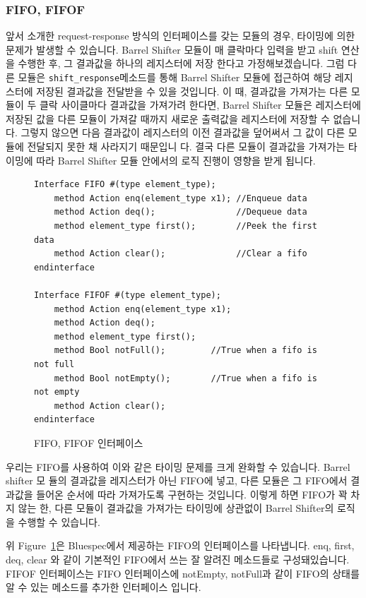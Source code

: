 \documentclass{article}
\begin{document}
\subsubsection{FIFO, FIFOF}
앞서 소개한 request-response 방식의 인터페이스를 갖는 모듈의 경우, 타이밍에 의한 문제가 발생할
수 있습니다. Barrel Shifter 모듈이 매 클락마다 입력을 받고 shift 연산을 수행한 후, 그 결과값을 하나의 레지스터에 저장
한다고 가정해보겠습니다. 그럼 다른 모듈은 \texttt{shift\_response}메소드를 통해 Barrel Shifter 모듈에
접근하여 해당 레지스터에 저장된 결과값을 전달받을 수 있을 것입니다. 이 때, 결과값을 가져가는 다른
모듈이 두 클락 사이클마다 결과값을 가져가려 한다면, Barrel Shifter 모듈은 레지스터에 저장된
값을 다른 모듈이 가져갈 때까지 새로운 출력값을 레지스터에 저장할 수 없습니다. 그렇지 않으면
다음 결과값이 레지스터의 이전 결과값을 덮어써서 그 값이 다른 모듈에 전달되지 못한 채 사라지기 때문입니
다. 결국 다른 모듈이 결과값을 가져가는 타이밍에 따라 Barrel Shifter 모듈 안에서의 로직 진행이
영향을 받게 됩니다.

\begin{figure}[!hb]
\begin{Verbatim}
Interface FIFO #(type element_type);
	method Action enq(element_type x1); //Enqueue data
	method Action deq();                //Dequeue data
	method element_type first();        //Peek the first data
	method Action clear();              //Clear a fifo
endinterface

Interface FIFOF #(type element_type);
	method Action enq(element_type x1);
	method Action deq();
	method element_type first();
	method Bool notFull();         //True when a fifo is not full
	method Bool notEmpty();        //True when a fifo is not empty
	method Action clear();
endinterface
\end{Verbatim}
	\caption{FIFO, FIFOF 인터페이스}
	\label{fig:fifo_interface}
\end{figure}


우리는 FIFO를 사용하여 이와 같은 타이밍 문제를 크게 완화할 수 있습니다. Barrel shifter 모
듈의 결과값을 레지스터가 아닌 FIFO에 넣고, 다른 모듈은 그 FIFO에서 결과값을 들어온 순서에
따라 가져가도록 구현하는 것입니다. 이렇게 하면 FIFO가 꽉 차지 않는 한, 다른 모듈이 결과값을
가져가는 타이밍에 상관없이 Barrel Shifter의 로직을 수행할 수 있습니다.

위 Figure~\ref{fig:fifo_interface}은 Bluespec에서 제공하는 FIFO의 인터페이스를 나타냅니다. enq, first, deq, clear
와 같이 기본적인 FIFO에서 쓰는 잘 알려진 메소드들로 구성돼있습니다. FIFOF 인터페이스는 FIFO
인터페이스에 notEmpty, notFull과 같이 FIFO의 상태를 알 수 있는 메소드를 추가한 인터페이스
입니다.
\end{document}
